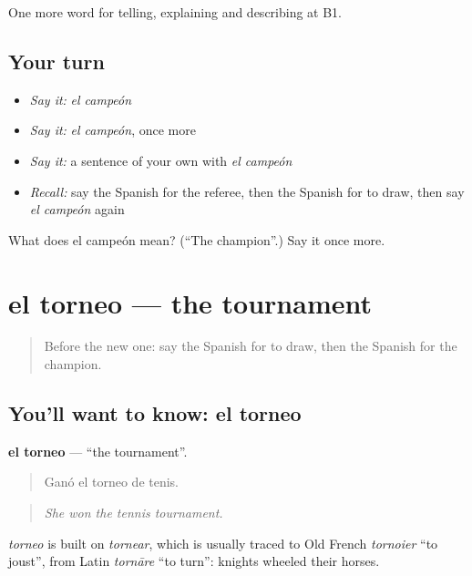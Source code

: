 \begin{grammarlens}[title={What you've built}]
One more word for telling, explaining and describing at B1.
\end{grammarlens}

\subsection*{Your turn}
\begin{itemize}
\raggedright
  \item \emph{Say it:} \emph{el campeón}
  \item \emph{Say it:} \emph{el campeón}, once more
  \item \emph{Say it:} a sentence of your own with \emph{el campeón}
  \item \emph{Recall:} say the Spanish for the referee, then the Spanish for to draw, then say \emph{el campeón} again
\end{itemize}

\begin{tcolorbox}[breakable,colback=teal!4,colframe=teal!35!black,title={Before you move on}]
What does el campeón mean? (\textquotedblleft{}The champion\textquotedblright{}.) Say it once more.
\end{tcolorbox}
\section[el torneo]{el torneo — the tournament}

\label{lesson:ES-C757-torneo}



\begin{quote}
Before the new one: say the Spanish for to draw, then the Spanish for the champion.
\end{quote}

\subsection*{You'll want to know: el torneo}
\textbf{el torneo} — \textquotedblleft{}the tournament\textquotedblright{}.

\begin{quote}
Ganó el torneo de tenis.
\end{quote}

\begin{quote}
\emph{She won the tennis tournament.}
\end{quote}

\begin{cousinweb}
\emph{torneo} is built on \emph{tornear}, which is usually traced to Old French \emph{tornoier} \textquotedblleft{}to joust\textquotedblright{}, from Latin \emph{tornāre} \textquotedblleft{}to turn\textquotedblright{}: knights wheeled their horses.
\end{cousinweb}

